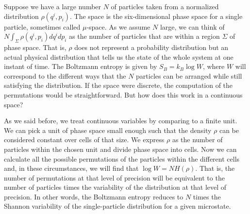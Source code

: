 \documentclass[iopart]{revtex4-1}
\begin{document}
Suppose we have a large number $N$ of particles taken from a normalized distribution $\rho(q^i, p_i)$. The space is the six-dimensional phase space for a single particle, sometimes called $\mu$-space. As we assume $N$ large, we can think of $N\int_\Sigma \rho(q^i, p_i)dq^idp_i$ as the number of particles that are within a region $\Sigma$ of phase space. That is, $\rho$ does not represent a probability distribution but an actual physical distribution that tells us the state of the whole system at one instant of time. The Boltzmann entropy is given by $S_B = k_B \log W$, where $W$ will correspond to the different ways that the $N$ particles can be arranged while still satisfying the distribution. If the space were discrete, the computation of the permutations would be straightforward. But how does this work in a continuous space?

As we said before, we treat continuous variables by comparing to a finite unit. We can pick a unit of phase space small enough such that the density $\rho$ can be considered constant over cells of that size. We express $\rho$ as the number of particles within the chosen unit and divide phase space into cells. Now we can calculate all the possible permutations of the particles within the different cells and, in these circumstances, we will find that $\log W = N H(\rho)$. That is, the number of permutations at that level of precision will be equivalent to the number of particles times the variability of the distribution at that level of precision. In other words, the Boltzmann entropy reduces to $N$ times the Shannon variability of the single-particle distribution for a given microstate.

\end{document}
